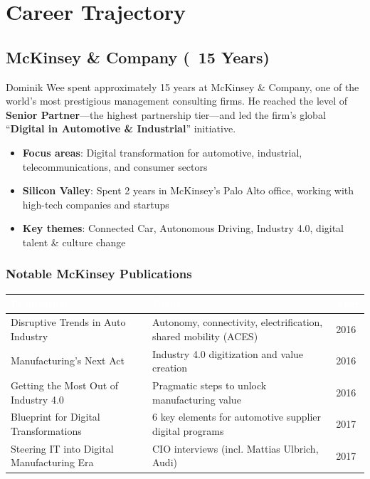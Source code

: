 \documentclass[11pt,a4paper]{article}
\begin{document}
\newpage

\section{Career Trajectory}

\subsection{McKinsey \& Company (~15 Years)}

Dominik Wee spent approximately 15 years at McKinsey \& Company, one of the world's most prestigious management consulting firms. He reached the level of \textbf{Senior Partner}---the highest partnership tier---and led the firm's global ``\textbf{Digital in Automotive \& Industrial}'' initiative.

\begin{itemize}
    \item \textbf{Focus areas}: Digital transformation for automotive, industrial, telecommunications, and consumer sectors
    \item \textbf{Silicon Valley}: Spent 2 years in McKinsey's Palo Alto office, working with high-tech companies and startups
    \item \textbf{Key themes}: Connected Car, Autonomous Driving, Industry 4.0, digital talent \& culture change
\end{itemize}

\subsubsection{Notable McKinsey Publications}

\begin{center}
\begin{longtable}{L{4.5cm}L{8cm}R{1.5cm}}
\toprule
{}
\textcolor{white}{\textbf{Publication}} & \textcolor{white}{\textbf{Focus}} & \textcolor{white}{\textbf{Year}} \\
\midrule
Disruptive Trends in Auto Industry & Autonomy, connectivity, electrification, shared mobility (ACES) & 2016 \\
Manufacturing's Next Act & Industry 4.0 digitization and value creation & 2016 \\
Getting the Most Out of Industry 4.0 & Pragmatic steps to unlock manufacturing value & 2016 \\
Blueprint for Digital Transformations & 6 key elements for automotive supplier digital programs & 2017 \\
Steering IT into Digital Manufacturing Era & CIO interviews (incl. Mattias Ulbrich, Audi) & 2017 \\
\bottomrule
\end{longtable}
\end{center}
\end{document}
